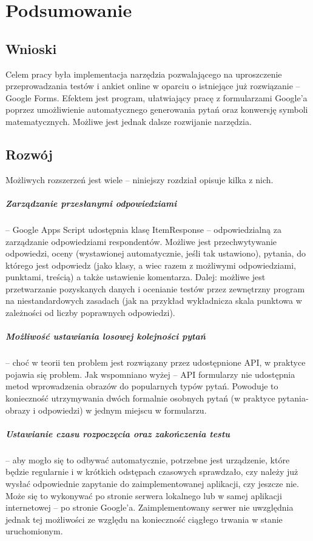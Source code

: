 \chapter{Podsumowanie}%

\section{Wnioski}
Celem pracy była implementacja narzędzia pozwalającego na uproszczenie przeprowadzania testów i ankiet online w oparciu o istniejące już rozwiązanie -- Google Forms.  Efektem jest program, ułatwiający pracę z formularzami Google'a poprzez umożliwienie automatycznego generowania pytań oraz konwersję symboli matematycznych.  Możliwe jest jednak dalsze rozwijanie narzędzia. 

\section{Rozwój}
Możliwych rozszerzeń jest wiele -- niniejszy rozdział opisuje kilka z nich.
\paragraph{Zarządzanie przesłanymi odpowiedziami} -- Google Apps Script udostępnia klasę ItemResponse -- odpowiedzialną za zarządzanie odpowiedziami respondentów. Możliwe jest przechwytywanie odpowiedzi, oceny (wystawionej automatycznie, jeśli tak ustawiono), pytania, do którego jest odpowiedz (jako klasy, a wiec razem z możliwymi odpowiedziami, punktami, treścią) a także ustawienie komentarza. Dalej: możliwe jest przetwarzanie pozyskanych danych i ocenianie testów przez zewnętrzny program na niestandardowych zasadach (jak na przykład wykładnicza skala punktowa w zależności od liczby poprawnych odpowiedzi).
\paragraph{Możliwość ustawiania losowej kolejności pytań} -- choć w teorii ten problem jest rozwiązany przez udostępnione API, w praktyce pojawia się problem. Jak wspomniano wyżej -- API formularzy nie udostępnia metod wprowadzenia obrazów do popularnych typów pytań. Powoduje to konieczność utrzymywania dwóch formalnie osobnych pytań (w praktyce pytania-obrazy i odpowiedzi) w jednym miejscu w formularzu.
\paragraph{Ustawianie czasu rozpoczęcia oraz zakończenia testu} -- aby mogło się to odbywać automatycznie, potrzebne jest urządzenie, które będzie regularnie i w krótkich odstępach czasowych sprawdzało, czy należy już wysłać odpowiednie zapytanie do zaimplementowanej aplikacji, czy jeszcze nie. Może się to wykonywać po stronie serwera lokalnego lub w samej aplikacji internetowej -- po stronie Google'a. Zaimplementowany serwer nie uwzględnia jednak tej możliwości ze względu na konieczność ciągłego trwania w stanie uruchomionym. 


